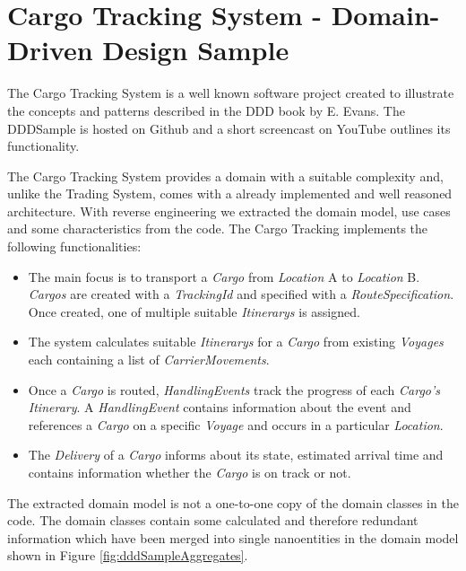 \section{Cargo Tracking System - Domain-Driven Design Sample}
\label{sec:dddSample}

The Cargo Tracking System is a well known software project created to illustrate the concepts and patterns described in the \gls{DDD} book by E. Evans\cite{evans2003domain}. The DDDSample is hosted on Github\cite{dddGithub} and a short screencast on YouTube\cite{dddScreencast} outlines its functionality. 

The Cargo Tracking System provides a domain with a suitable complexity and, unlike the Trading System, comes with a already implemented and well reasoned architecture. With reverse engineering we extracted the domain model, use cases and some characteristics from the code. The Cargo Tracking implements the following functionalities:

\begin{itemize}
	\item The main focus is to transport a \textit{Cargo} from \textit{Location} A to \textit{Location} B. \textit{Cargos} are created with a \textit{TrackingId} and specified with a \textit{RouteSpecification}. Once created, one of multiple suitable \textit{Itinerarys} is assigned.
	\item The system calculates suitable \textit{Itinerarys} for a \textit{Cargo} from existing \textit{Voyages} each containing a list of \textit{CarrierMovements}.
	\item Once a \textit{Cargo} is routed, \textit{HandlingEvents} track the progress of each \textit{Cargo's} \textit{Itinerary}. A \textit{HandlingEvent} contains information about the event and references a \textit{Cargo} on a specific \textit{Voyage} and occurs in a particular \textit{Location}. 
	\item The \textit{Delivery} of a \textit{Cargo} informs about its state, estimated arrival time and contains information whether the \textit{Cargo} is on track or not.
\end{itemize}

The extracted domain model is not a one-to-one copy of the domain classes in the code. The domain classes contain some calculated and therefore redundant information which have been merged into single nanoentities in the domain model shown in Figure \ref{fig:dddSampleAggregates}. 

